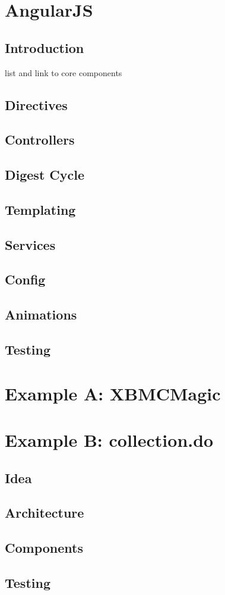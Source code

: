 

\chapter{AngularJS}
\section{Introduction}

list and link to core components

\section{Directives}
\section{Controllers}
\section{Digest Cycle}
\section{Templating}
\section{Services}
\section{Config}
\section{Animations}
\section{Testing}

\chapter{Example A: XBMCMagic}
\label{ch:xbmc}




\chapter{Example B: collection.do}
\label{ch:collection}

\section{Idea}
\section{Architecture}
\section{Components}
\section{Testing}